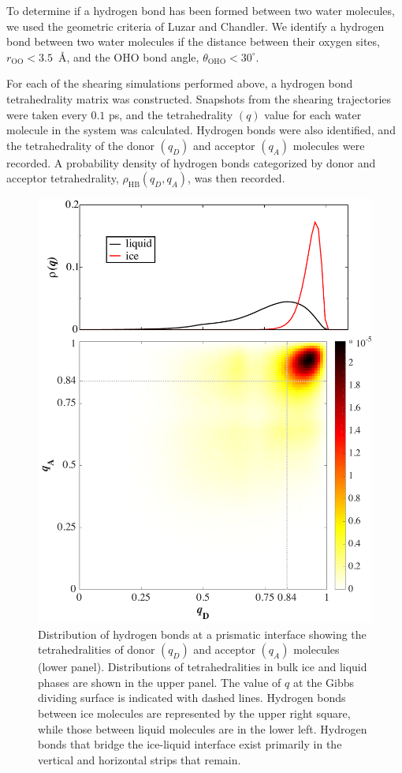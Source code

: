 To determine if a hydrogen bond has been formed between two water
molecules, we used the geometric criteria of Luzar and
Chandler.\cite{Luzar1996} We identify a hydrogen bond between two
water molecules if the distance between their oxygen sites,
$r_\mathrm{OO} < 3.5$~\AA, and the OHO bond angle,
$\theta_\mathrm{OHO} < 30^\circ$.

For each of the shearing simulations performed above, a hydrogen bond
tetrahedrality matrix was constructed.  Snapshots from the shearing
trajectories were taken every $0.1$ ps, and the tetrahedrality $(q)$
value for each water molecule in the system was calculated. Hydrogen
bonds were also identified, and the tetrahedrality of the donor
$(q_{D})$ and acceptor $(q_{A})$ molecules were recorded. A
probability density of hydrogen bonds categorized by donor and
acceptor tetrahedrality, $\rho_\mathrm{HB}(q_D, q_A)$, was then
recorded.

\begin{figure}
\includegraphics[width=5in]{Figures/hbtet.pdf}
\caption{\label{fig:tetHBMatrix} Distribution of hydrogen bonds at a
  prismatic interface showing the tetrahedralities of donor $(q_D)$
  and acceptor $(q_A)$ molecules (lower panel). Distributions of
  tetrahedralities in bulk ice and liquid phases are shown in the
  upper panel. The value of $q$ at the Gibbs dividing surface is
  indicated with dashed lines. Hydrogen bonds between ice molecules
  are represented by the upper right square, while those between
  liquid molecules are in the lower left.  Hydrogen bonds that bridge
  the ice-liquid interface exist primarily in the vertical and
  horizontal strips that remain.}
\end{figure}

